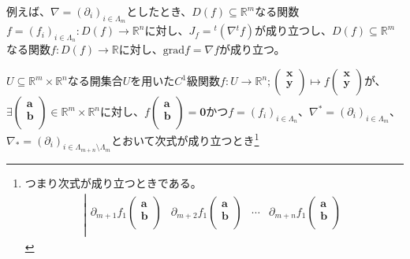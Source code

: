 \documentclass[dvipdfmx]{jsarticle}
\begin{document}
例えば、$\nabla = \left( \partial_{i} \right)_{i \in \varLambda_{m} }$としたとき、$D(f) \subseteq \mathbb{R}^{m}$なる関数$f = \left( f_{i} \right)_{i \in \varLambda_{n}}:D(f) \rightarrow \mathbb{R}^{n}$に対し、$J_{f} ={}^{t}\left( \nabla{}^{t}f \right)$が成り立つし、$D(f) \subseteq \mathbb{R}^{m}$なる関数$f:D(f) \rightarrow \mathbb{R}$に対し、$\mathrm{grad}f = \nabla f$が成り立つ。
\begin{thm}[よりよい陰関数定理]\label{4.4.1.3}
$U \subseteq \mathbb{R}^{m} \times \mathbb{R}^{n}$なる開集合$U$を用いた$C^{1}$級関数$f:U \rightarrow \mathbb{R}^{n};\begin{pmatrix}
\mathbf{x} \\
\mathbf{y} \\
\end{pmatrix} \mapsto f\begin{pmatrix}
\mathbf{x} \\
\mathbf{y} \\
\end{pmatrix}$が、$\exists\begin{pmatrix}
\mathbf{a} \\
\mathbf{b} \\
\end{pmatrix} \in \mathbb{R}^{m} \times \mathbb{R}^{n}$に対し、$f\begin{pmatrix}
\mathbf{a} \\
\mathbf{b} \\
\end{pmatrix} = \mathbf{0}$かつ$f = \left( f_{i} \right)_{i \in \varLambda_{n}}$、$\nabla^{*} = \left( \partial_{i} \right)_{i \in \varLambda_{m}}$、$\nabla_{*} = \left( \partial_{i} \right)_{i \in \varLambda_{m + n} \setminus \varLambda_{m}}$とおいて次式が成り立つとき\footnote{つまり次式が成り立つときである。
\begin{align*}
\left| \begin{matrix}
  \partial_{m + 1}f_{1} \begin{pmatrix} \mathbf{a} \\ \mathbf{b} \\ \end{pmatrix} & \partial_{m + 2}f_{1} \begin{pmatrix} \mathbf{a} \\ \mathbf{b} \\ \end{pmatrix} & \cdots & \partial_{m + n}f_{1} \begin{pmatrix} \mathbf{a} \\ \mathbf{b} \\ \end{pmatrix} \\

\end{matrix}
\end{align*}}
\end{thm}
\end{document}
